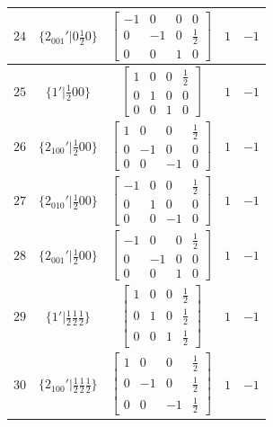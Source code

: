 \documentclass[fleqn,8pt]{jsarticle}
\begin{document}
\begin{longtable}{ccccc}
$ 24 $ & $ \{2{}_{001}{}'|0 \frac{1}{2} 0\} $ & $ \begin{bmatrix} -1 & 0 & 0 & 0 \\ 0 & -1 & 0 & \frac{1}{2} \\ 0 & 0 & 1 & 0 \end{bmatrix} $ & $ 1 $ & $ -1 $ \\ \hline
$ 25 $ & $ \{1{}'|\frac{1}{2} 0 0\} $ & $ \begin{bmatrix} 1 & 0 & 0 & \frac{1}{2} \\ 0 & 1 & 0 & 0 \\ 0 & 0 & 1 & 0 \end{bmatrix} $ & $ 1 $ & $ -1 $ \\ \hline
$ 26 $ & $ \{2{}_{100}{}'|\frac{1}{2} 0 0\} $ & $ \begin{bmatrix} 1 & 0 & 0 & \frac{1}{2} \\ 0 & -1 & 0 & 0 \\ 0 & 0 & -1 & 0 \end{bmatrix} $ & $ 1 $ & $ -1 $ \\ \hline
$ 27 $ & $ \{2{}_{010}{}'|\frac{1}{2} 0 0\} $ & $ \begin{bmatrix} -1 & 0 & 0 & \frac{1}{2} \\ 0 & 1 & 0 & 0 \\ 0 & 0 & -1 & 0 \end{bmatrix} $ & $ 1 $ & $ -1 $ \\ \hline
$ 28 $ & $ \{2{}_{001}{}'|\frac{1}{2} 0 0\} $ & $ \begin{bmatrix} -1 & 0 & 0 & \frac{1}{2} \\ 0 & -1 & 0 & 0 \\ 0 & 0 & 1 & 0 \end{bmatrix} $ & $ 1 $ & $ -1 $ \\ \hline
$ 29 $ & $ \{1{}'|\frac{1}{2} \frac{1}{2} \frac{1}{2}\} $ & $ \begin{bmatrix} 1 & 0 & 0 & \frac{1}{2} \\ 0 & 1 & 0 & \frac{1}{2} \\ 0 & 0 & 1 & \frac{1}{2} \end{bmatrix} $ & $ 1 $ & $ -1 $ \\ \hline
$ 30 $ & $ \{2{}_{100}{}'|\frac{1}{2} \frac{1}{2} \frac{1}{2}\} $ & $ \begin{bmatrix} 1 & 0 & 0 & \frac{1}{2} \\ 0 & -1 & 0 & \frac{1}{2} \\ 0 & 0 & -1 & \frac{1}{2} \end{bmatrix} $ & $ 1 $ & $ -1 $ \\ \hline

\end{longtable}
\end{document}
